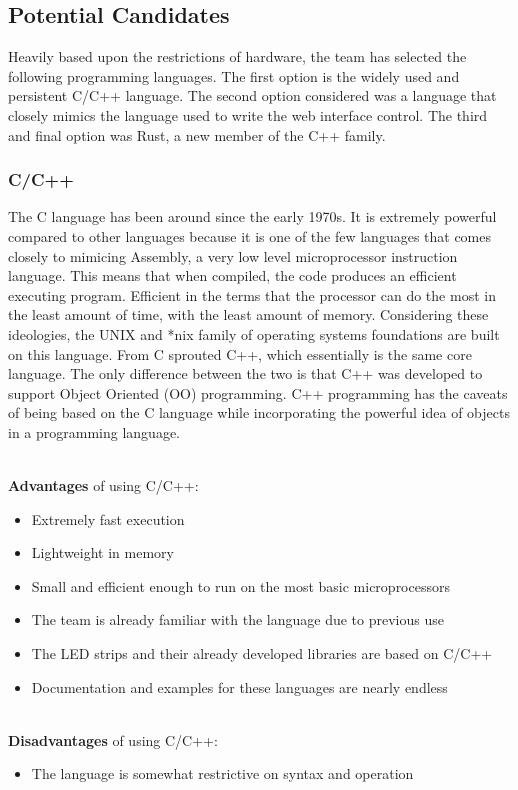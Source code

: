 		\subsection{Potential Candidates}
		Heavily based upon the restrictions of hardware, the team has selected the following programming languages.  The first option is the widely used and persistent C/C++ language.
		The second option considered was a language that closely mimics the language used to write the web interface control.  The third and final option was Rust, a new member of the
		C++ family.

		\subsubsection{C/C++}
		The C language has been around since the early 1970s. \cite{LANG1}  It is extremely powerful compared to other languages because it is one of the few languages that comes closely
		to mimicing Assembly, a very low level microprocessor instruction language.  This means that when compiled, the code produces an efficient executing program.  Efficient in the terms
		that the processor can do the most in the least amount of time, with the least amount of memory. Considering these ideologies, the UNIX and *nix family of operating systems
		foundations are built on this language.  From C sprouted C++, which essentially is the same core language.  The only difference between the two is that C++ was developed to support Object Oriented (OO) programming.  C++ programming has the caveats of
		being based on the C language while incorporating the powerful idea of objects in a programming language.

		\noindent \\ \textbf{Advantages} of using C/C++:
		\begin{itemize}
			\item Extremely fast execution
			\item Lightweight in memory
			\item Small and efficient enough to run on the most basic microprocessors
			\item The team is already familiar with the language due to previous use
			\item The LED strips and their already developed libraries are based on C/C++
			\item Documentation and examples for these languages are nearly endless
		\end{itemize}

		\noindent \\ \textbf{Disadvantages} of using C/C++:
		\begin{itemize}
			\item The language is somewhat restrictive on syntax and operation
		\end{itemize}


